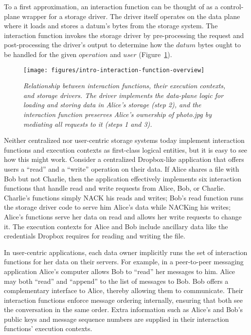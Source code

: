 To a first approximation, an
interaction function can be thought of as a control-plane wrapper for a
storage driver.  The driver itself operates on the data plane where it
loads and stores a datum's bytes from the storage
system.  The interaction function invokes the storage driver by
pre-processing the request and post-processing the driver's output to
determine how the $datum$ bytes ought to be handled for the given $operation$ and $user$
(Figure~\ref{fig:intro-interaction-function-overview}).

\begin{figure}[ht!]
   \centering
   \texttt{[image: figures/intro-interaction-function-overview]}
   \caption{\it Relationship between interaction functions, their execution
   contexts, and storage drivers.
   The driver implements the data-plane logic for loading and storing data in
   Alice's storage (step 2), and the interaction function preserves Alice's ownership of
   \textit{photo.jpg} by mediating all requests to it (steps 1 and 3).}
   \label{fig:intro-interaction-function-overview}
\end{figure}

Neither centralized nor user-centric storage systems today implement
interaction functions and execution contexts as first-class
logical entities, but it is easy to see how this might work.  Consider a
centralized Dropbox-like application that offers users a ``read'' and a ``write'' operation
on their data.  If Alice shares a
file with Bob but not Charlie, then
the application effectively implements six interaction functions that handle
read and write requests from Alice, Bob, or Charlie.  Charlie's functions simply
NACK his reads and writes; Bob's read function runs the storage driver code to serve him Alice's data
while NACKing his writes; Alice's functions serve her data on read and allows
her write requests to change it.  The execution contexts for
Alice and Bob include ancillary data like the credentials Dropbox
requires for reading and writing the file.

In user-centric applications, each data owner implicitly runs the set of interaction
functions for her data on their servers.  For example, in a peer-to-peer messaging application
Alice's computer allows Bob to ``read'' her messages to him.
Alice may both ``read'' and ``append'' to the list of messages to Bob.
Bob offers a complementary interface to Alice, thereby allowing them to
communicate.  Their interaction functions enforce message ordering internally, ensuring that
both see the conversation in the same order.  Extra information such as Alice's and
Bob's public keys and message sequence numbers are supplied in their interaction
functions' execution contexts.

